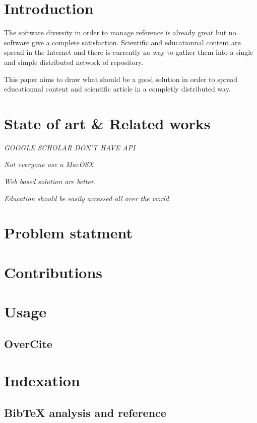 \section{Introduction}

The software diversity in order to manage reference is already 
great but no software give a complete satisfaction. Scientific and
educationnal content are spread in the Internet and there is currently
no way to gather them into a single and simple distributed network of repository.

This paper aims to draw what should be a good solution in order to 
spread educationnal content and scientific article in a completly distributed 
way.


\section{State of art \& Related works}

\textit{GOOGLE SCHOLAR DON'T HAVE API}

\textit{Not everyone use a MacOSX}

\textit{Web based solution are better.}

\textit{Education should be easily accessed all over the world}

\section{Problem statment}

\section{Contributions}

\section{Usage}

\subsection{OverCite}

\section{Indexation}


\subsection{Bib\TeX{} analysis and reference}

